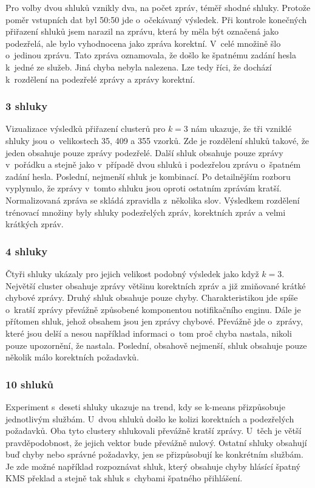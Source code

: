 \documentclass[thesis=M,czech]{FITthesis}[2012/10/20]
\begin{document}
					Pro volby dvou shluků vznikly dva, na počet zpráv, téměř shodné shluky. Protože poměr vstupních dat byl 50:50 jde o~očekávaný výsledek. Při kontrole konečných přiřazení shluků jsem narazil na zprávu, která by měla být označená jako podezřelá, ale bylo vyhodnocena jako zpráva korektní. V~celé množině šlo o~jedinou zprávu. Tato zpráva oznamovala, že došlo ke špatnému zadání hesla k~jedné ze služeb. Jiná chyba nebyla nalezena. Lze tedy říci, že dochází k~rozdělení na podezřelé zprávy a zprávy korektní.
				
				\subsubsection{3 shluky}
					Vizualizace výsledků přiřazení clusterů pro $k = 3$ nám ukazuje, že tři vzniklé shluky jsou o~velikostech 35, 409 a 355 vzorků. Zde je rozdělení shluků takové, že jeden obsahuje pouze zprávy podezřelé. Další shluk obsahuje pouze zprávy v~pořádku a stejně jako v~případě dvou shluků i podezřelou zprávu o~špatném zadání hesla. Poslední, nejmenší shluk je kombinací. Po detailnějším rozboru vyplynulo, že zprávy v~tomto shluku jsou oproti ostatním zprávám kratší. Normalizovaná zpráva se skládá zpravidla z~několika slov. Výsledkem rozdělení trénovací množiny byly shluky podezřelých zpráv, korektních zpráv a velmi krátkých zpráv.
				
				\subsubsection{4 shluky}
				Čtyři shluky ukázaly pro jejich velikost podobný výsledek jako když $k = 3$. Největší cluster obsahuje zprávy většinu korektních zpráv a již zmiňované krátké chybové zprávy. Druhý shluk obsahuje pouze chyby. Charakteristikou jde spíše o~kratší zprávy převážně způsobené komponentou notifikačního enginu. Dále je přítomen shluk, jehož obsahem jsou jen zprávy chybové. Převážně jde o~zprávy, které jsou delší a nesou například informaci o~tom proč chyba nastala, nikoli pouze upozornění, že nastala. Poslední, obsahově nejmenší, shluk obsahuje pouze několik málo korektních požadavků. 
				
				\subsubsection{10 shluků}
				Experiment s~deseti shluky ukazuje na trend, kdy se k-means přizpůsobuje jednotlivým službám. U~dvou shluků došlo ke kolizi korektních a podezřelých požadavků. Oba tyto clustery shlukovali převážně kratší zprávy. U~těch je větší pravděpodobnost, že jejich vektor bude převážně nulový. Ostatní shluky obsahují buď chyby nebo správné požadavky, jen se přizpůsobují ke konkrétním službám. Je zde možné například rozpoznávat shluk, který obsahuje chyby hlásící špatný KMS překlad a stejně tak shluk s~chybami špatného přihlášení.
				
\end{document}
